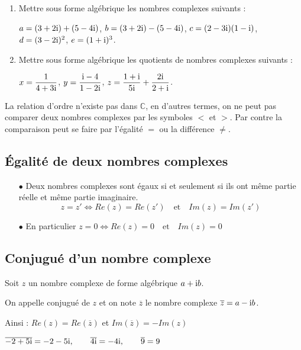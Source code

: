 \begin{exercice}
\begin{enumerate}
\item Mettre sous forme algébrique  les nombres complexes suivants :

\medskip 

$ a=(3 + 2\text{i}) + (5 - 4\text{i}) $,\;\; $ b=(3 + 2\text{i}) - (5 - 4\text{i}) $,\;\; $ c=(2 - 3\text{i})(1 - \text{i}) $,\;\; $ d=(3 - 2\text{i})^2$,\;\; $ e=(1 + \text{i})^3$. 

\item Mettre sous forme algébrique  les quotients de nombres complexes suivants :

\medskip 

$ x=\dfrac{1}{4+3\text{i}} $,\;\; $ y=\dfrac{\text{i}-4}{1-2\text{i}} $,\;\; $ z=\dfrac{1+\text{i}}{5\text{i}} +\dfrac{2\text{i}}{2+\text{i}}$.
\end{enumerate}

\end{exercice}
\begin{remark}
 La relation d'ordre n'existe pas dans $ \mathbb{C} $, en d'autres termes, on ne peut pas comparer deux nombres complexes par les symboles $ <$ et $ >$. Par contre la comparaison peut se faire par l'égalité  $ =$ ou  la différence $ \neq$.
 \end{remark}
\subsection*{Égalité de deux nombres complexes}
\begin{enumerate}
\item[$  \bullet$] Deux nombres complexes sont égaux si et seulement si ils ont même partie
réelle et même partie imaginaire.
\[z=z' \Longleftrightarrow Re(z)=Re(z')\quad \text{et}\quad Im(z)=Im(z')\]
\item[$  \bullet$] En particulier $ z=0 \Longleftrightarrow Re(z)=0\quad \text{et}\quad Im(z)=0$
\end{enumerate}

\subsection*{Conjugué d'un nombre complexe}
\begin{definition}
Soit $ z $ un nombre complexe de forme algébrique  $ a+ \text{i} b$.

\medskip

On appelle conjugué de $ z $ et on note $ \overline{z} $ le nombre complexe $ \overline{z} =a- \text{i} b$.

\medskip

Ainsi :  $ Re(z)=Re(\overline{z}) $ et $ Im(\overline{z})=-Im(z) $

\end{definition}
\begin{example}
 $ \overline{-2+5\text{i}} =-2-5\text{i},
\qquad  \overline{4\text{i}} =-4\text{i},\qquad 
 \overline{9} =9$
\end{example}
\medskip

